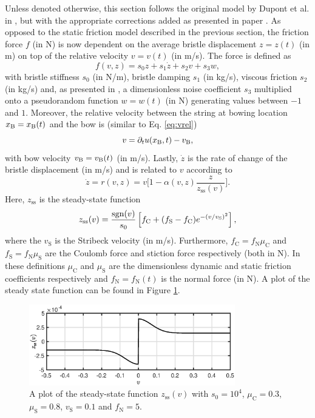 

Unless denoted otherwise, this section follows the original model by Dupont et al. in \cite{Dupont2002}, but with the appropriate corrections added as presented in paper \citeP[C]. As opposed to the static friction model described in the previous section, the friction force $f$ (in N) is now dependent on the average bristle displacement $z = z(t)$ (in m) on top of the relative velocity $v = v(t)$ (in m/s). The force is defined as
\begin{equation}\label{eq:elastoPlasticForce}
    f(v, z) = s_0z + s_1\dot z + s_2v + s_3w,
\end{equation}
with bristle stiffness $s_0$ (in N/m), bristle damping $s_1$ (in kg/s), viscous friction $s_2$ (in kg/s) and, as presented in \cite{Serafin2004}, a dimensionless noise coefficient $s_3$ multiplied onto a pseudorandom function $w = w(t)$ (in N) generating values between $-1$ and $1$. Moreover, the relative velocity between the string at bowing location $x_{\text{B}} = x_{\text{B}}(t)$ and the bow is (similar to Eq. \eqref{eq:vrel})
\begin{equation}\label{eq:vrelElasto}
    v = \partial_t u(x_{\text{B}},t) - v_{\text{B}},
\end{equation}
with bow velocity $v_{\text{B}} = v_{\text{B}}(t)$ (in m/s). Lastly, $\dot z$ is the rate of change of the bristle displacement (in m/s) and is related to $v$ according to
\begin{equation}\label{eq:zdot}
    \dot z = r(v, z) = v \bigg[ 1-  \alpha(v, z)\frac{z}{z_\text{ss}(v)}\bigg].
\end{equation}
Here, $z_\text{ss}$ is the steady-state function
\begin{equation}\label{eq:zss}
    z_\text{ss}(v) = \frac{\text{sgn}(v)}{s_0}\left[f_\text{C}+(f_\text{S}-f_\text{C})e^{-(v/v_\text{S})^2}\right],
\end{equation}
where the $v_\text{S}$ is the Stribeck velocity (in m/s). Furthermore, $f_\text{C} = f_\text{N}\mu_\text{C}$ and $f_\text{S} = f_\text{N}\mu_\text{S}$ are the Coulomb force and stiction force respectively (both in N). In these definitions $\mu_\text{C}$ and $\mu_\text{S}$ are the dimensionless dynamic and static friction coefficients respectively and $f_\text{N} = f_\text{N}(t)$ is the normal force (in N). A plot of the steady state function can be found in Figure \ref{fig:zss}.

\begin{figure}[ht]
    \centering
    \includegraphics[width=0.8\textwidth]{figures/exciters/steadyState.eps}
    \caption{\label{fig:zss}A plot of the steady-state function $z_\text{ss}(v)$ with $s_0 = 10^4$, $\mu_\text{C} = 0.3$, $\mu_\text{S} = 0.8$, $v_\text{S} = 0.1$ and $f_\text{N} = 5$.}
\end{figure}

